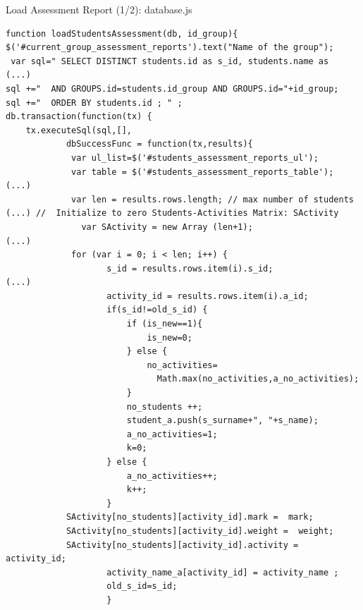 \begin{bclogo}[couleur=blue!30,arrondi=0.1,ombre=true ] 
{Load Assessment Report (1/2): database.js \label{load_assessment_1}}
\begin{verbatim}
function loadStudentsAssessment(db, id_group){
$('#current_group_assessment_reports').text("Name of the group");
 var sql=" SELECT DISTINCT students.id as s_id, students.name as 
(...)
sql +="  AND GROUPS.id=students.id_group AND GROUPS.id="+id_group;
sql +="  ORDER BY students.id ; " ;
db.transaction(function(tx) {
    tx.executeSql(sql,[],
            dbSuccessFunc = function(tx,results){
             var ul_list=$('#students_assessment_reports_ul');
             var table = $('#students_assessment_reports_table');
(...)
             var len = results.rows.length; // max number of students
(...) //  Initialize to zero Students-Activities Matrix: SActivity
               var SActivity = new Array (len+1);
(...)                                        
             for (var i = 0; i < len; i++) {
                    s_id = results.rows.item(i).s_id;
(...)                    
                    activity_id = results.rows.item(i).a_id;
                    if(s_id!=old_s_id) {
                        if (is_new==1){
                            is_new=0;
                        } else {
                            no_activities=
                              Math.max(no_activities,a_no_activities);
                        }
                        no_students ++; 
                        student_a.push(s_surname+", "+s_name);
                        a_no_activities=1;
                        k=0;
                    } else { 
                        a_no_activities++;
                        k++;
                    }
            SActivity[no_students][activity_id].mark =  mark;
            SActivity[no_students][activity_id].weight =  weight;
            SActivity[no_students][activity_id].activity = activity_id;
                    activity_name_a[activity_id] = activity_name ;
                    old_s_id=s_id;
                    }
\end{verbatim}
\end{bclogo}
\newpage

